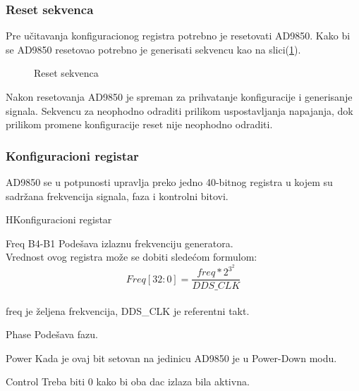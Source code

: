 \subsubsection{Reset sekvenca}
Pre učitavanja konfiguracionog registra potrebno je resetovati AD9850.
Kako bi se AD9850 resetovao potrebno je generisati sekvencu kao na slici(\ref{ad9850_rst_seq}). \\

\begin{figure}[H]
  \centering{
    \scalebox{1.2}{
      
    }}
  \caption{Reset sekvenca}
  \label{ad9850_rst_seq}
\end{figure}

Nakon resetovanja AD9850 je spreman za prihvatanje konfiguracije i generisanje signala.
Sekvencu za neophodno odraditi prilikom uspostavljanja napajanja, dok prilikom promene
konfiguracije reset nije neophodno odraditi.

\subsubsection{Konfiguracioni registar}

AD9850 se u potpunosti upravlja preko jedno 40-bitnog registra u kojem su
sadržana frekvencija signala, faza i kontrolni bitovi.

\begin{register}{H}{Konfiguracioni registar}{}%
  \label{example}%
   \\
  \begin{regdesc}\begin{reglist}
    \item [Freq B4-B1] Podešava izlaznu frekvenciju generatora.\\
      Vrednost ovog registra može se dobiti sledećom formulom:
      \[
      Freq [32:0] = \frac{freq*2^3^2}{DDS\_CLK}
      \] \\
      freq je željena frekvencija, DDS\_CLK je referentni takt.
    \item [Phase] Podešava fazu.
    \item [Power] Kada je ovaj bit setovan na jedinicu AD9850 je u Power-Down modu.
    \item [Control] Treba biti 0 kako bi oba \gls{dac} izlaza bila aktivna.
    \end{reglist}\end{regdesc}
\end{register}

